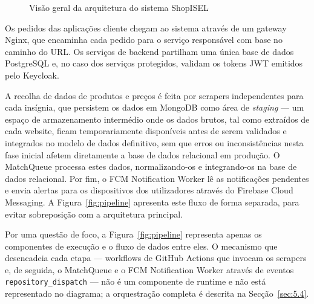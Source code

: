 \begin{figure}[H]
\caption{Visão geral da arquitetura do sistema ShopISEL}
\label{fig:arquitetura}
\end{figure}

Os pedidos das aplicações cliente chegam ao sistema através de um gateway Nginx, que encaminha cada pedido para o serviço responsável com base no caminho do URL. Os serviços de backend partilham uma única base de dados PostgreSQL e, no caso dos serviços protegidos, validam os tokens \ac{JWT} emitidos pelo Keycloak.

A recolha de dados de produtos e preços é feita por scrapers independentes para cada insígnia, que persistem os dados em MongoDB como área de \textit{staging} — um espaço de armazenamento intermédio onde os dados brutos, tal como extraídos de cada website, ficam temporariamente disponíveis antes de serem validados e integrados no modelo de dados definitivo, sem que erros ou inconsistências nesta fase inicial afetem diretamente a base de dados relacional em produção. O MatchQueue processa estes dados, normalizando-os e integrando-os na base de dados relacional. Por fim, o FCM Notification Worker lê as notificações pendentes e envia alertas para os dispositivos dos utilizadores através do Firebase Cloud Messaging. A Figura~\ref{fig:pipeline} apresenta este fluxo de forma separada, para evitar sobreposição com a arquitetura principal.

Por uma questão de foco, a Figura~\ref{fig:pipeline} representa apenas os componentes de execução e o fluxo de dados entre eles. O mecanismo que desencadeia cada etapa — workflows de GitHub Actions que invocam os scrapers e, de seguida, o MatchQueue e o FCM Notification Worker através de eventos \texttt{repository\_dispatch} — não é um componente de runtime e não está representado no diagrama; a orquestração completa é descrita na Secção~\ref{sec:5.4}.

